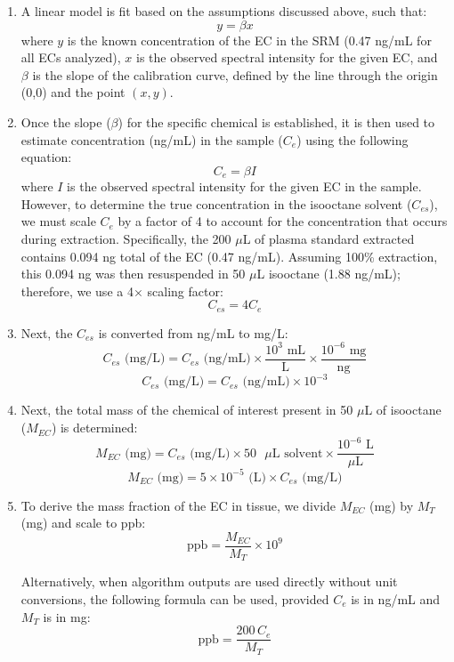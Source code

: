 \begin{enumerate}
\item A linear model is fit based on the assumptions discussed above, such that:
\[ y = \beta x \]
where $y$ is the known concentration of the EC in the SRM (0.47 ng/mL for all ECs analyzed), $x$ is the observed spectral intensity for the given EC, and $\beta$ is the slope of the calibration curve, defined by the line through the origin (0,0) and the point $(x,y)$.

\item Once the slope ($\beta$) for the specific chemical is established, it is then used to estimate concentration (ng/mL) in the sample ($C_e$) using the following equation:
\[ C_e = \beta I \]
where $I$ is the observed spectral intensity for the given EC in the sample. However, to determine the true concentration in the isooctane solvent ($C_{es}$), we must scale $C_e$ by a factor of 4 to account for the concentration that occurs during extraction. Specifically, the 200 $\mu$L of plasma standard extracted contains 0.094 ng total of the EC (0.47 ng/mL). Assuming 100\% extraction, this 0.094 ng was then resuspended in 50 $\mu$L isooctane (1.88 ng/mL); therefore, we use a 4$\times$ scaling factor:
\[ C_{es} = 4 C_e \]

\item Next, the $C_{es}$ is converted from ng/mL to mg/L:
\[ C_{es} \text{ (mg/L)} = C_{es} \text{ (ng/mL)} \times \frac{10^{3} \text{ mL}}{\text{L}} \times \frac{10^{-6} \text{ mg}}{\text{ng}} \]
\[ C_{es} \text{ (mg/L)} = C_{es} \text{ (ng/mL)} \times 10^{-3} \]

\item Next, the total mass of the chemical of interest present in 50 $\mu$L of isooctane ($M_{EC}$) is determined:
\[ M_{EC} \text{ (mg)} = C_{es} \text{ (mg/L)} \times 50 \text{ } \mu\text{L solvent} \times \frac{10^{-6} \text{ L}}{\mu\text{L}} \]
\[ M_{EC} \text{ (mg)} = 5 \times 10^{-5} \text{ (L)} \times C_{es} \text{ (mg/L)} \]

\item To derive the mass fraction of the EC in tissue, we divide $M_{EC}$ (mg) by $M_T$ (mg) and scale to ppb:
\[ \text{ppb} = \frac{M_{EC}}{M_T} \times 10^{9} \]

\noindent Alternatively, when algorithm outputs are used directly without unit conversions, the following formula can be used, provided $C_e$ is in ng/mL and $M_T$ is in mg:
\[ \text{ppb} = \frac{200 \, C_e}{M_T} \]
\end{enumerate}
